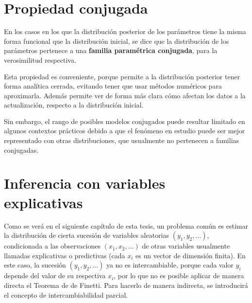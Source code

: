\section{Propiedad conjugada}

En los casos en los que la distribuci\'on posterior de los par\'ametros tiene la misma forma funcional que la distribuci\'on inicial, se dice que la distribuci\'on de los par\'ametros pertenece a una \textbf{familia param\'etrica conjugada}, para la verosimilitud respectiva.

Esta propiedad es conveniente, porque permite a la distribuci\'on posterior tener forma anal\'itica cerrada, evitando tener que usar m\'etodos num\'ericos para aproximarla. Adem\'as permite ver de forma m\'as clara c\'omo afectan los datos a la actualizaci\'on, respecto a la distribuci\'on inicial.

Sin embargo, el rango de posibles modelos conjugados puede resultar limitado en algunos contextos pr\'acticos debido a que el fen\'omeno en estudio puede ser mejor representado con otras distribuciones, que usualmente no pertenecen a familias conjugadas.

\section[Inferencia con variables explicativas]{Inferencia con variables explicativas\raisebox{.3\baselineskip}{\normalsize\footnotemark}}

Como se ver\'a en el siguiente cap\'itulo de esta tesis, un problema com\'un es estimar la distribuci\'on de cierta sucesi\'on de variables aleatorias $(y_1,y_2,\ldots)$, condicionada a las observaciones $(x_1,x_2,\ldots)$ de otras variables usualmente llamadas explicativas o predictivas (cada $x_i$ es un vector de dimensi\'on finita). En este caso, la sucesi\'on $(y_1,y_2,\ldots)$ ya no es intercambiable, porque cada valor $y_i$ depende del valor de su respectiva $x_i$, por lo que no es posible aplicar de manera directa el Teorema de de Finetti. Para hacerlo de manera indirecta, se introducir\'a el concepto de intercambiabilidad parcial.

